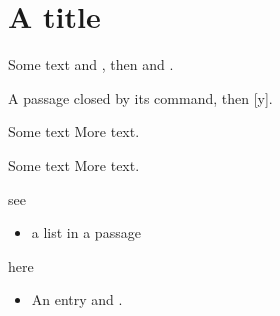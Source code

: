 \flmHeading[toc=true]
\section{A title }{\flmLabels{}}

Some text  and \phf[a remark], then  and .

\phf A passage closed by its command,\endphf{} then [y].

Some text  More text.

Some text  More text.

\phf see \begin{itemize}\item a list in a passage\end{itemize} here \endphf

\begin{itemize}
\item An entry  and \phf[remarked].
\end{itemize}

